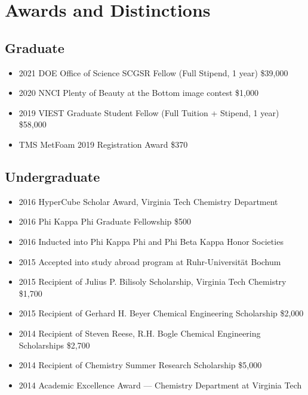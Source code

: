 \documentclass[11pt]{article} %
\begin{document}


\section*{Awards and Distinctions}

\subsection*{Graduate}
\begin{itemize}
  \item 2021 DOE Office of Science SCGSR Fellow (Full Stipend, 1 year) \hfill \$39,000
  \item 2020 NNCI Plenty of Beauty at the Bottom image contest \hfill \$1,000
  \item 2019 VIEST Graduate Student Fellow (Full Tuition + Stipend, 1 year) \hfill \$58,000
  \item TMS MetFoam 2019 Registration Award \hfill \$370
\end{itemize}

\subsection*{Undergraduate}
\begin{itemize}
  \item 2016 HyperCube Scholar Award, Virginia Tech Chemistry Department
  \item 2016 Phi Kappa Phi Graduate Fellowship \hfill \$500
  \item 2016 Inducted into Phi Kappa Phi and Phi Beta Kappa Honor Societies
  \item 2015 Accepted into study abroad program at Ruhr-Universität Bochum
  \item 2015 Recipient of Julius P. Bilisoly Scholarship, Virginia Tech Chemistry \hfill \$1,700
  \item 2015 Recipient of Gerhard H. Beyer Chemical Engineering Scholarship \hfill \$2,000
  \item 2014 Recipient of Steven Reese, R.H. Bogle Chemical Engineering Scholarships \hfill \$2,700
  \item 2014 Recipient of Chemistry Summer Research Scholarship \hfill \$5,000
  \item 2014 Academic Excellence Award --- Chemistry Department at Virginia Tech
\end{itemize}
\end{document}

